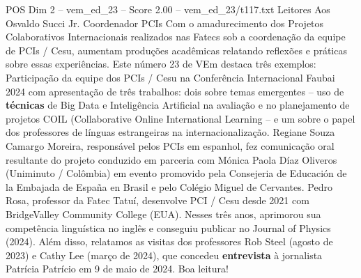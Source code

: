 \begin{textsample}{POS Dim 2 – vem\_ed\_23 – Score 2.00 – vem\_ed\_23/t117.txt}  \label{ex:f2_pos_114}
Leitores Aos Osvaldo Succi Jr.
Coordenador PCIs Com o amadurecimento dos Projetos Colaborativos Internacionais realizados nas Fatecs sob a coordenação da equipe de PCIs / Cesu, aumentam produções acadêmicas relatando reflexões e práticas sobre essas experiências.
Este número 23 de VEm destaca três exemplos: Participação da equipe dos PCIs / Cesu na Conferência Internacional Faubai 2024 com apresentação de três trabalhos: dois sobre temas emergentes – uso de \textbf{técnicas} de Big Data e Inteligência Artificial na avaliação e no planejamento de projetos COIL (Collaborative Online International Learning – e um sobre o papel dos professores de línguas estrangeiras na internacionalização.
Regiane Souza Camargo Moreira, responsável pelos PCIs em espanhol, fez comunicação oral resultante do projeto conduzido em parceria com Mónica Paola Díaz Oliveros (Uniminuto / Colômbia) em evento promovido pela Consejeria de Educación de la Embajada de España en Brasil e pelo Colégio Miguel de Cervantes.
Pedro Rosa, professor da Fatec Tatuí, desenvolve PCI / Cesu desde 2021 com BridgeValley Community College (EUA).
Nesses três anos, aprimorou sua competência linguística no inglês e conseguiu publicar no Journal of Physics (2024).
Além disso, relatamos as visitas dos professores Rob Steel (agosto de 2023) e Cathy Lee (março de 2024), que concedeu \textbf{entrevista} à jornalista Patrícia Patrício em 9 de maio de 2024.
Boa leitura!

\end{textsample}
